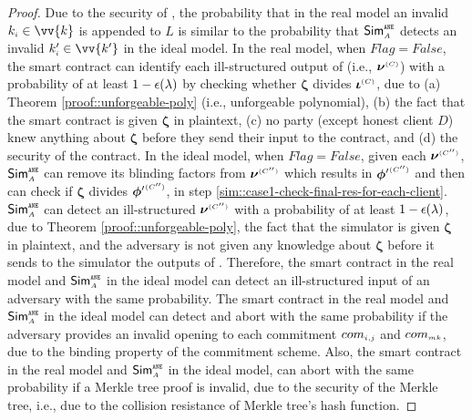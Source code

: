 \begin{proof}
Due to the security of \zspaa, the probability that in the real model an invalid $k_{\st i}\in \vv{k}$ is appended to $ L$ is similar to the probability that  $\mathsf{Sim}^{\scriptscriptstyle \mathtt{ANE}}_{\scriptscriptstyle A}$ detects an invalid $ k'_{\st i}\in \vv{k'}$ in the ideal model. In the real model, when $Flag=False$, the smart contract can identify each ill-structured output of \vopr (i.e.,  $\bm\nu^{ \scriptscriptstyle {  {(C)}} }$) with a probability of at least $1-\epsilon(\lambda)$ by checking whether $\bm\zeta$  divides $\bm\iota^{ \scriptscriptstyle {  {(C)}}}$, due to  (a) Theorem \ref{proof::unforgeable-poly} (i.e., unforgeable polynomial), (b) the fact that the smart contract is given $\bm \zeta$ in plaintext, (c) no party (except honest client $D$) knew anything about $\bm \zeta$ before they send their input to the contract, and (d) the security of the contract.  
%
In the ideal model, when $Flag=False$, given each ${\bm\nu}^{ \scriptscriptstyle {  {(C'')}} }$, $\mathsf{Sim}^{\scriptscriptstyle \mathtt{ANE}}_{\scriptscriptstyle A}$ can remove its blinding factors from  ${\bm\nu}^{ \scriptscriptstyle {  {(C'')}} }$ which results in $ {\bm\phi'}^{ \scriptscriptstyle {  {(C'')}} }$ and then can check if ${\bm\zeta}$  divides $ {\bm\phi'}^{ \scriptscriptstyle {  {(C'')}} }$, in step \ref{sim::case1-check-final-res-for-each-client}. $\mathsf{Sim}^{\scriptscriptstyle \mathtt{ANE}}_{\scriptscriptstyle A}$ can detect an ill-structured  ${\bm\nu}^{ \scriptscriptstyle {  {(C'')}} }$ with a probability of at least $1-\epsilon(\lambda)$, due to Theorem \ref{proof::unforgeable-poly}, the fact that the simulator is given ${\bm \zeta}$ in plaintext,  and the adversary is not given any knowledge about ${\bm \zeta}$ before it sends to the simulator the outputs of \vopr.  Therefore, the smart contract in the real model and $\mathsf{Sim}^{\scriptscriptstyle \mathtt{ANE}}_{\scriptscriptstyle A}$ in the ideal model can detect an ill-structured input of an adversary with the same probability.  
%
The smart contract in the real model and $\mathsf{Sim}^{\scriptscriptstyle \mathtt{ANE}}_{\scriptscriptstyle A}$ in the ideal model can detect and abort with the same probability if the adversary provides an invalid opening to each commitment $com_{\scriptscriptstyle i,j}$ and $com_{\scriptscriptstyle {mk}}$, due to the binding property of the commitment scheme. Also, the smart contract in the real model and $\mathsf{Sim}^{\scriptscriptstyle \mathtt{ANE}}_{\scriptscriptstyle A}$ in the ideal model, can abort with the same probability if a Merkle tree proof is invalid, due to the security of the Merkle tree, i.e., due to the collision resistance of Merkle tree's hash function. 




\end{proof}
